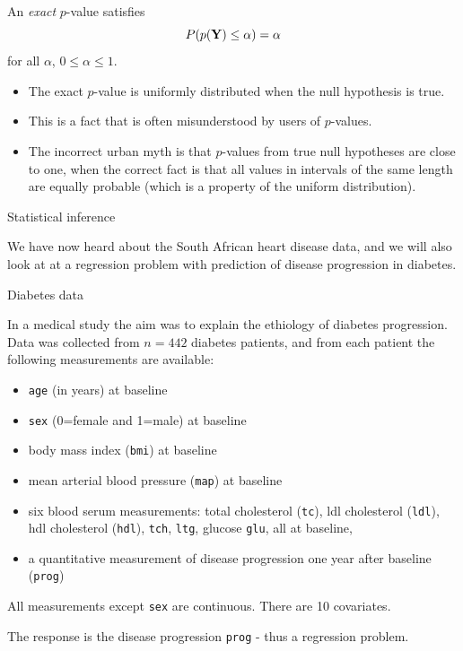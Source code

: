 \documentclass[
  ignorenonframetext,
]{beamer}
\providecommand{\tightlist}{%
  \setlength{\itemsep}{0pt}\setlength{\parskip}{0pt}}
\begin{document}
\begin{frame}

An \emph{exact} \(p\)-value satisfies
\[P(p(\bf{Y}) \leq \alpha) = \alpha\] for all \(\alpha\),
\(0 \leq \alpha \leq 1\).

\begin{itemize}
\tightlist
\item
  The exact \(p\)-value is uniformly distributed when the null
  hypothesis is true.
\item
  This is a fact that is often misunderstood by users of \(p\)-values.
\item
  The incorrect urban myth is that \(p\)-values from true null
  hypotheses are close to one, when the correct fact is that all values
  in intervals of the same length are equally probable (which is a
  property of the uniform distribution).
\end{itemize}

\end{frame}

\begin{frame}{Statistical inference}
\protect\hypertarget{statistical-inference}{}

We have now heard about the South African heart disease data, and we
will also look at at a regression problem with prediction of disease
progression in diabetes.

\end{frame}

\begin{frame}[fragile]

\begin{block}{Diabetes data}

In a medical study the aim was to explain the ethiology of diabetes
progression. Data was collected from \(n=442\) diabetes patients, and
from each patient the following measurements are available:

\begin{itemize}
\tightlist
\item
  \texttt{age} (in years) at baseline
\item
  \texttt{sex} (0=female and 1=male) at baseline
\item
  body mass index (\texttt{bmi}) at baseline
\item
  mean arterial blood pressure (\texttt{map}) at baseline
\item
  six blood serum measurements: total cholesterol (\texttt{tc}), ldl
  cholesterol (\texttt{ldl}), hdl cholesterol (\texttt{hdl}),
  \texttt{tch}, \texttt{ltg}, glucose \texttt{glu}, all at baseline,
\item
  a quantitative measurement of disease progression one year after
  baseline (\texttt{prog})
\end{itemize}

All measurements except \texttt{sex} are continuous. There are 10
covariates.

The response is the disease progression \texttt{prog} - thus a
regression problem.

\end{block}

\end{frame}
\end{document}
